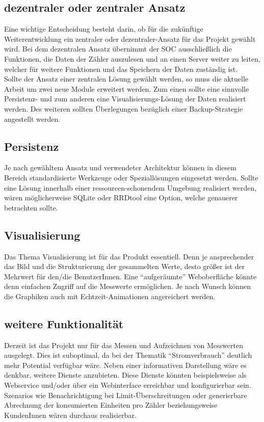 \documentclass[Bachelorarbeit.tex]{subfiles}
\begin{document}
\subsection*{dezentraler oder zentraler Ansatz}
Eine wichtige Entscheidung besteht darin, ob für die zukünftige Weiterentwicklung ein zentraler oder dezentraler-Ansatz für das Projekt gewählt wird. 
Bei dem dezentralen Ansatz übernimmt der \ac{SOC} ausschließlich die Funktionen, die Daten der Zähler auszulesen und an einen Server weiter zu leiten, welcher für weitere Funktionen und das Speichern der Daten zuständig ist. \\
Sollte der Ansatz einer zentralen Lösung gewählt werden, so muss die aktuelle Arbeit um zwei neue Module erweitert werden. Zum einen sollte eine sinnvolle Persistenz- und zum anderen eine Visualisierungs-Lösung der Daten realisiert werden. Des weiteren sollten Überlegungen bezüglich einer Backup-Strategie angestellt werden.

\subsection*{Persistenz} 
Je nach gewähltem Ansatz und verwendeter Architektur können in diesem Bereich standardisierte Werkzeuge oder Speziallösungen eingesetzt werden. 
Sollte eine Lösung innerhalb einer ressourcen-schonendem Umgebung realisiert werden, wären möglicherweise SQLite oder RRDtool \parencite[siehe:][]{rrd_tool} eine Option, welche genauerer betrachten sollte.

\subsection*{Visualisierung}  
Das Thema Visualisierung ist für das Produkt essentiell. Denn je ansprechender das Bild und die Strukturierung der gesammelten Werte, desto größer ist der Mehrwert für den/die BenutzerInnen. Eine "`aufgeräumte"' Weboberfläche könnte denn einfachen Zugriff auf die Messwerte ermöglichen. Je nach Wunsch können die Graphiken auch mit Echtzeit-Animationen angereichert werden.
 
\subsection*{weitere Funktionalität}
Derzeit ist das Projekt nur für das Messen und Aufzeichnen von Messwerten ausgelegt. 
Dies ist suboptimal, da bei der Thematik "`Stromverbrauch"' deutlich mehr Potential verfügbar wäre. 
Neben einer informativen Darstellung wäre es denkbar, weitere Dienste anzubieten. 
Diese Dienste könnten beispielsweise als Webservice und/oder über ein Webinterface erreichbar und konfigurierbar sein. Szenarios wie Benachrichtigung bei Limit-Überschreitungen oder generierbare Abrechnung der konsumierten Einheiten pro Zähler beziehungsweise KundenInnen wären durchaus realisierbar.  
\end{document}
